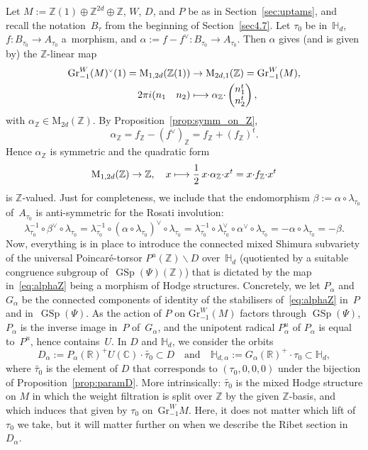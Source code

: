 \documentclass[JEP,XML,SOM,Unicode,NoFloatCountersInSection]{cedram}
\def\mto{\mathchoice{\longmapsto}{\mapsto}{\mapsto}{\mapsto}}
\let\oldvee\vee
\renewcommand{\vee}{{\scriptscriptstyle\oldvee}}
\theoremstyle{plain}
\theoremstyle{definition}
\numberwithin{equation}{subsection}
\renewcommand{\C}{\mathbb C}
\newcommand{\R}{\mathbb R}
\newcommand{\Z}{\mathbb Z}
\renewcommand{\H}{\mathbb H}
\newcommand{\Gr}{\mathrm{Gr}}
\newcommand{\rmM}{\mathrm{M}}
\DeclareMathOperator{\GSp}{GSp}
\begin{document}
Let $M:=\Z(1)\oplus\Z^{2d}\oplus\Z$, $W$, $D$, and $P$ be as in
Section~\ref{sec:uptams}, and recall the notation~$B_\tau$ from the
beginning of Section~\ref{sec4.7}.
Let $\tau_0$ be in~$\H_d$, $f\colon B_{\tau_0}\to
A_{\tau_0}$ a~morphism, and $\alpha:=f-f^\vee\colon B_{\tau_0}\to
A_{\tau_0}$. Then $\alpha$ gives (and is given by) the $\Z$-linear map
\begin{equation}\label{eq:alphaZ}
\begin{aligned}
\Gr^W_{-1}(M)^\vee(1) = \rmM_{1,2d}(\Z(1)) & \to \rmM_{2d,1}(\Z)
= \Gr^W_{-1} (M),\\
2\pi i (\begin{matrix} n_1 & n_2\end{matrix}) & \mto
\alpha_\Z{\cdot}\begin{pmatrix} n_1^t\\ n_2^t\end{pmatrix},
\end{aligned}
\end{equation}
with $\alpha_\Z \in\rmM_{2d}(\Z)$.
By Proposition~\ref{prop:symm_on_Z},
\[
\alpha_\Z = f_\Z -(f^\vee)_\Z = f_\Z +(f_\Z)^t.
\]
Hence $\alpha_\Z$ is symmetric and the quadratic form
\[
\rmM_{1,2d}(\Z) \to \Z,\quad
x\mto \frac{1}{2}\,x{\cdot}\alpha_\Z{\cdot}x^t = x{\cdot}f_\Z{\cdot}x^t
\]
is $\Z$-valued. Just for completeness, we include that the
endomorphism $\beta:=\alpha\circ \lambda_{\tau_0}$ of~$A_{\tau_0}$ is
anti-symmetric for the Rosati involution:
\[
\lambda_{\tau_0}^{-1}\circ \beta^\vee \circ \lambda_{\tau_0} =
\lambda_{\tau_0}^{-1}\circ (\alpha\circ \lambda_{\tau_0})^\vee \circ
\lambda_{\tau_0} =
\lambda_{\tau_0}^{-1}\circ \lambda_{\tau_0}^\vee\circ\alpha^\vee \circ
\lambda_{\tau_0} = -\alpha \circ \lambda_{\tau_0} =-\beta.
\]
Now, everything is in place to introduce the connected mixed Shimura
subvariety of the universal Poincaré-torsor $P^u(\Z)\backslash D$
over~$\H_d$ (quotiented by a suitable congruence subgroup
of~$\GSp(\Psi)(\Z)$) that is dictated by the map in~\eqref{eq:alphaZ}
being a morphism of Hodge structures. Concretely, we let $P_\alpha$
and $G_\alpha$ be the connected components of identity of the
stabilisers of~\eqref{eq:alphaZ} in~$P$ and in~$\GSp(\Psi)$. As the
action of $P$ on $\Gr^W_{-1}(M)$ factors through $\GSp(\Psi)$,
$P_\alpha$ is the inverse image in~$P$ of~$G_\alpha$, and the
unipotent radical $P_\alpha^u$ of $P_\alpha$ is equal to~$P^u$, hence
contains~$U$. In $D$ and $\H_d$, we consider the orbits
\begin{equation}\label{eq:Dalpha}
D_\alpha:=P_\alpha(\R)^+U(\C){\cdot}\widetilde{\tau_0} \subset D
\quad\text{and}\quad
\H_{d,\alpha}:=G_\alpha(\R)^+{\cdot}\tau_0 \subset \H_d ,
\end{equation}
where $\widetilde{\tau_0}$ is the element of $D$ that corresponds to
$(\tau_0,0,0,0)$ under the bijection of
Proposition~\ref{prop:paramD}. More intrinsically:
$\widetilde{\tau_0}$ is the mixed Hodge structure on $M$ in which the
weight filtration is split over $\Z$ by the given $\Z$-basis, and
which induces that given by $\tau_0$ on~$\Gr^W_{-1}M$. Here, it does
not matter which lift of $\tau_0$ we take, but it will matter further
on when we describe the Ribet section in~$D_\alpha$.
\end{document}
